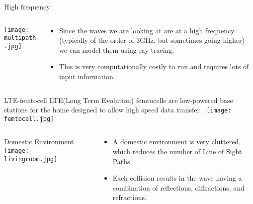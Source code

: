 \documentclass[final]{beamer}
\theoremstyle{plain}
\theoremstyle{definition}
\theoremstyle{remark}
\newlength{\twocolwid}
\begin{document}
\begin{frame}[t]
\begin{columns}[t]
\begin{column}{\twocolwid}
\begin{block}{High frequency}
\vspace{-2cm}
\begin{columns}
\begin{column}{0.45\linewidth}
\texttt{[image: multipath.jpg]} \cite{Multipath} 
\end{column}
\begin{column}{0.55\linewidth}
\vspace{-1cm}
\begin{itemize}
\item
Since the waves we are looking at are at a high frequency (typically of the order of 3GHz, but sometimes going higher)  we can model them using ray-tracing.
\item This is very computationally costly to run and requires lots of input information.
\end{itemize}
\end{column}
\end{columns}
\end{block}

\begin{alertblock}{LTE-femtocell}
LTE(Long Term Evolution) femtocells are low-powered base stations for the home designed to allow high speed data transfer
\cite{zyren2007overview, LTEfemtocells}.
\centering
\center
\texttt{[image: femtocell.jpg]} \cite{femtocells} 
\end{alertblock}
\begin{columns}
\begin{column}{0.45\linewidth}

\begin{block}{Domestic Environment}
\vspace{-1cm}
\texttt{[image: livingroom.jpg]} 
\end{block}

\end{column}
\begin{column}{0.01\linewidth}

\end{column}
\begin{column}{0.45\linewidth}
\vspace{-1.25cm}
\begin{mdframed}[backgroundcolor=white, userdefinedwidth=0.999999\linewidth]
\vspace{0.5cm}
\begin{itemize}
\item A domestic environment is very cluttered, which reduces the number of Line of Sight Paths.
\item Each collision results in the wave having a combination of reflections, diffractions, and refractions. 
\end{itemize}
\vspace{0.5cm}
\end{mdframed}


\end{column}
\end{columns}
\end{column}
\end{columns}
\end{frame}
\end{document}
